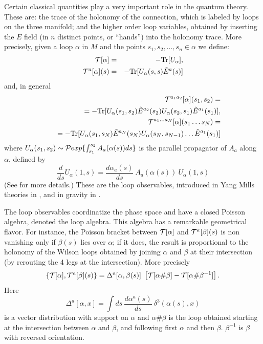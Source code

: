 \documentclass[12pt]{article}
\begin{document}
Certain classical quantities play a very important role in the 
quantum theory.  These are: the trace of the holonomy of the 
connection, which is labeled by loops on the three manifold; and 
the higher order loop variables, obtained by inserting the $E$ 
field (in $n$ distinct points, or ``hands'') into the holonomy 
trace.  More precisely, given a loop $\alpha$ in $M$ and the 
points $s_1,s_2,\ldots,s_n\in\alpha$ we define:
 \begin{eqnarray}
  {\cal T}[\alpha]          &=& - {\rm Tr} [U_\alpha] ,
\label{t0}  \\
  {\cal T}^a[\alpha](s)     
      &=& - {\rm Tr} [U_\alpha(s,s) \tilde{E}^a(s)] 
\label{t1}
\end{eqnarray}
and, in general
\begin{eqnarray}
&&{\cal T}^{a_1a_2}[\alpha](s_1,s_2) = \nonumber \\  
&&\ \ =  - {\rm Tr} [U_\alpha(s_1,s_2) \tilde{E}^{a_2}(s_2) 
                U_\alpha(s_2,s_1) \tilde{E}^{a_1}(s_1) ] ,
\label{tn} \\
&& {\cal T}^{a_1\ldots a_N}[\alpha](s_1 \ldots s_N) = 
\nonumber \\  
&& \ \ = 
- {\rm Tr} [U_\alpha(s_1,s_N) \tilde{E}^{a_N}(s_N)
                U_\alpha(s_N,s_{N-1}) \ldots 
\tilde{E}^{a_1}(s_1) ]  
\nonumber
\end{eqnarray}
 where $U_{\alpha}(s_{1},s_{2})\sim{\cal P} exp 
 \{\int_{s_{1}}^{s_{2}} 
 A_{a}(\alpha(s))ds \}$ is the parallel propagator of $A_a$ along 
 $\alpha$, defined by 
 \begin{equation}
	 \frac{d}{ds}U_{\alpha}(1,s) = \frac{d\alpha_{a}(s)}{ds} \ 
	 A_{a}(\alpha(s))\ U_{\alpha}(1,s)
 \end{equation}
  (See \cite{DePietriRovelli} for more details.)  These are the 
  loop observables, introduced in Yang Mills theories in 
  \cite{GambiniTrias2,GambiniTrias}, and in gravity in 
  \cite{RovelliSmolin88,RovelliSmolin90}.

  The loop observables coordinatize the phase space and have a 
  closed Poisson algebra, denoted the loop algebra.  This algebra 
  has a remarkable geometrical flavor.  For instance, the Poisson 
  bracket between ${\cal T}[\alpha]$ and ${\cal T}^a[\beta](s)$ 
  is non vanishing only if $\beta(s)$ lies over $\alpha$; if it 
  does, the result is proportional to the holonomy of the Wilson 
  loops obtained by joining $\alpha$ and $\beta$ at their 
  intersection (by rerouting the 4 legs at the intersection).  
  More precisely
\begin{equation}
	\{{\cal T}[\alpha], {\cal T}^a[\beta](s) \} =
	\Delta^{a}[\alpha,\beta(s)] \ \left[{\cal T}
	[\alpha\#\beta]-{\cal T}[\alpha\#\beta^{-1}]\right].
\end{equation}
Here 
\begin{equation}
		\Delta^{a}[\alpha,x] = \int ds\ 
		\frac{d\alpha^{a}(s)}{ds}\ \delta^{3}(\alpha(s),x)
	\label{Delta}
\end{equation}
is a vector distribution with support on $\alpha$ and 
$\alpha\#\beta$ is the loop obtained starting at the intersection 
between $\alpha$ and $\beta$, and following first $\alpha$ and 
then $\beta$.  $\beta^{-1}$ is $\beta$ with reversed orientation.
\end{document}
